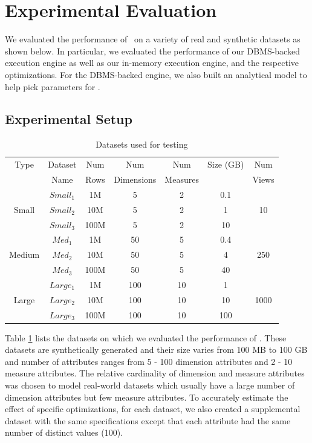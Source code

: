 
\section{Experimental Evaluation}

We evaluated the performance of \SeeDB\ on a variety of real and synthetic
datasets as shown below. 
In particular, we evaluated the performance of our
DBMS-backed execution engine as well as our in-memory execution engine, and the
respective optimizations. 
For the DBMS-backed engine, we also built an analytical model to help pick
parameters for \SeeDB.

\subsection{Experimental Setup}

\begin{table}[htb]
  \centering \scriptsize
  \begin{tabular}{|c|c|c|c|c|c|c|} \hline
  Type & Dataset & Num  & Num  & Num  & Size (GB) &
  Num \\
  & Name & Rows & Dimensions &  Measures & & Views \\ \hline 
   & $Small_1$ & 1M & 5 & 2 &  0.1 & \\ 
  Small & $Small_2$ & 10M & 5 & 2 &  1 & 10\\ 
   & $Small_3$ & 100M & 5 & 2 &  10 & \\ \hline
   & $Med_1$ & 1M & 50 & 5 &  0.4 & \\
  Medium & $Med_2$ & 10M & 50 & 5 &  4 & 250\\ 
   & $Med_3$ & 100M & 50 & 5 &  40 & \\ \hline
   & $Large_1$ & 1M & 100 & 10 &  1 & \\
  Large & $Large_2$ & 10M & 100 & 10 &  10 & 1000\\
   & $Large_3$ & 100M & 100 & 10 &  100 & \\ \hline
  \end{tabular}
  \caption{Datasets used for testing}
  \label{tab:datasets} 
\end{table}

Table \ref{tab:datasets} lists the datasets on which we evaluated the
performance of \SeeDB. These datasets are synthetically generated and their size
varies from 100 MB to 100 GB and number of attributes ranges from 5 - 100 dimension attributes and 2 -
 10 measure attributes. The relative cardinality of dimension and measure attributes
was chosen to model real-world datasets which usually have a large number of
dimension attributes but few measure attributes. To accurately estimate the
effect of specific optimizations, for each dataset, we also created a
supplemental dataset with the same specifications except that each attribute had
the same number of distinct values (100).

